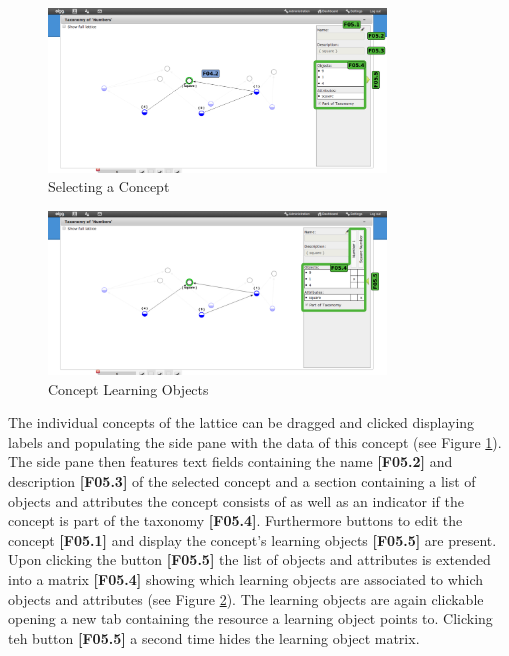\documentclass[a4paper,11pt]{article}
\begin{document}
\begin{figure}[h]
\begin{center}
\includegraphics[width=0.8\textwidth]{figures/taxonomy_select}  
\end{center}
\caption{Selecting a Concept}
\label{fig:fca-taxonomy-sel}
\end{figure}

\begin{figure}[h]
\begin{center}
\includegraphics[width=0.8\textwidth]{figures/taxonomy_lo}  
\end{center}
\caption{Concept Learning Objects}
\label{fig:fca-taxonomy-lo}
\end{figure}
The individual concepts of the lattice can be dragged and clicked displaying labels and populating the side pane with the data of this concept (see Figure \ref{fig:fca-taxonomy-sel}). The side pane then features text fields containing the name \textbf{[F05.2]} and description \textbf{[F05.3]} of the selected concept and a section containing a list of objects and attributes the concept consists of  as well as an indicator if the concept is part of the taxonomy \textbf{[F05.4]}. Furthermore buttons to edit the concept \textbf{[F05.1]} and display the concept's learning objects \textbf{[F05.5]} are present.
Upon clicking the button \textbf{[F05.5]} the list of objects and attributes is extended into a matrix \textbf{[F05.4]} showing which learning objects are associated to which objects and attributes (see Figure \ref{fig:fca-taxonomy-lo}). The learning objects are again clickable opening a new tab containing the resource a learning object points to. Clicking teh button \textbf{[F05.5]} a second time hides the learning object matrix.
\end{document}

